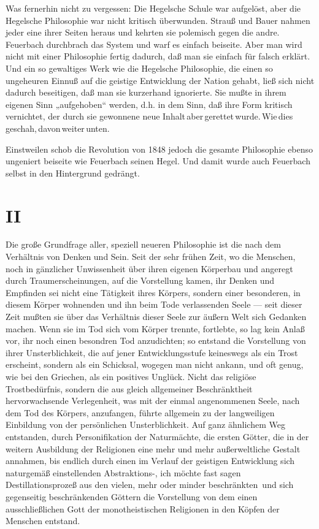 Was fernerhin nicht zu vergessen: Die Hegelsche Schule war
aufgelöst, aber die Hegelsche Philosophie war nicht kritisch überwunden.
Strauß und Bauer nahmen jeder eine ihrer Seiten heraus und kehrten sie
polemisch gegen die andre. Feuerbach durchbrach das System und warf es
einfach beiseite. Aber man wird nicht mit einer Philosophie fertig
dadurch, daß man sie einfach für falsch erklärt. Und ein so gewaltiges
Werk wie die Hegelsche Philosophie, die einen so ungeheuren Einnuß auf
die geistige Entwicklung der Nation gehabt, ließ sich nicht dadurch
beseitigen, daß man sie kurzerhand ignorierte. Sie mußte in ihrem
eigenen Sinn „aufgehoben`` werden, d.h. in dem Sinn, daß ihre Form
kritisch vernichtet, der durch sie gewonnene neue Inhalt\,aber\,gerettet\,wurde.\,Wie\,dies\,geschah,\,davon\,weiter\,unten.

Einstweilen schob die Revolution von 1848 jedoch die gesamte
Philosophie ebenso ungeniert beiseite wie Feuerbach seinen Hegel. Und
damit wurde auch Feuerbach selbst in den Hintergrund gedrängt.

\quebra

\mbox{}
\vspace{2cm}

\section{II}



\noindent{}Die große Grundfrage aller, speziell neueren Philosophie ist die
nach dem Verhältnis von Denken und Sein. Seit der sehr frühen Zeit, wo
die Menschen, noch in gänzlicher Unwissenheit über ihren eigenen
Körperbau und angeregt durch Traumerscheinungen, auf die Vorstellung
kamen, ihr Denken und Empfinden sei nicht eine Tätigkeit ihres Körpers,
sondern einer besonderen, in diesem Körper wohnenden und ihn beim Tode
verlassenden Seele --- seit dieser Zeit mußten sie über das Verhältnis
dieser Seele zur äußern Welt sich Gedanken machen. Wenn sie im Tod sich
vom Körper trennte, fortlebte, so lag kein Anlaß vor, ihr noch einen
besondren Tod anzudichten; so entstand die Vorstellung von ihrer
Unsterblichkeit, die auf jener Entwicklungsstufe keineswegs als ein
Trost erscheint, sondern als ein Schicksal, wogegen man nicht ankann,
und oft genug, wie bei den Griechen, als ein positives Unglück. Nicht
das religiöse Trostbedürfnis, sondern die aus gleich allgemeiner
Beschränktheit hervorwachsende Verlegenheit, was mit der einmal
angenommenen Seele, nach dem Tod des Körpers, anzufangen, führte
allgemein zu der langweiligen Einbildung von der persönlichen
Unsterblichkeit. Auf ganz ähnlichem Weg entstanden, durch
Personifikation der Naturmächte, die ersten Götter, die in der weitern
Ausbildung der Religionen eine mehr und mehr außerweltliche Gestalt
annahmen, bis endlich durch einen im Verlauf der geistigen Entwicklung
sich naturgemäß einstellenden Abstraktions-, ich möchte fast sagen %
Destillationsprozeß aus den vielen, mehr oder minder beschränkten\est\ und
sich gegenseitig beschränkenden Göttern die Vorstellung von dem einen
ausschließlichen Gott der monotheistischen Religionen in den Köpfen der
Menschen entstand.

